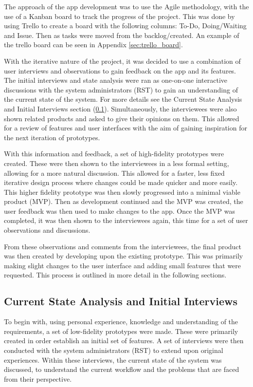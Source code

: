 \documentclass [11pt,a4paper]{article}
\begin{document}
The approach of the app development was to use the Agile methodology, with the use of a Kanban board to track the progress of the project. This was done by using Trello to create a board with the following columns: To-Do, Doing/Waiting and Issue. Then as tasks were moved from the backlog/created. An example of the trello board can be seen in Appendix \ref{sec:trello_board}.

With the iterative nature of the project, it was decided to use a combination of user interviews and observations to gain feedback on the app and its features. The initial interviews and state analysis were ran as one-on-one interactive discussions with the system administrators (RST) to gain an understanding of the current state of the system. For more details see the Current State Analysis and Initial Interviews section (\ref{sec:current_state_analysis}). Simultaneously, the interviewees were also shown related products and asked to give their opinions on them. This allowed for a review of features and user interfaces with the aim of gaining inspiration for the next iteration of prototypes. 

With this information and feedback, a set of high-fidelity prototypes were created. These were then shown to the interviewees in a less formal setting, allowing for a more natural discussion. This allowed for a faster, less fixed iterative design process where changes could be made quicker and more easily. This higher fidelity prototype was then slowly progressed into a minimal viable product (MVP). Then as development continued and the MVP was created, the user feedback was then used to make changes to the app. Once the MVP was completed, it was then shown to the interviewees again, this time for a set of user observations and discussions. 

From these observations and comments from the interviewees, the final product was then created by developing upon the existing prototype. This was primarily making slight changes to the user interface and adding small features that were requested. This process is outlined in more detail in the following sections.

\subsection{Current State Analysis and Initial Interviews}
\label{sec:current_state_analysis}

To begin with, using personal experience, knowledge and understanding of the requirements, a set of low-fidelity prototypes were made. These were primarily created in order establish an initial set of features. A set of interviews were then conducted with the system administrators (RST) to extend upon original experiences.  Within these interviews, the current state of the system was discussed, to understand the current workflow and the problems that are faced from their perspective.
\end{document}
